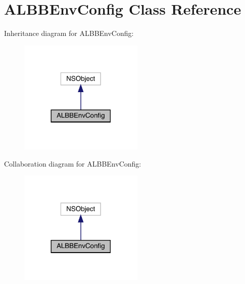 \hypertarget{interface_a_l_b_b_env_config}{}\section{A\+L\+B\+B\+Env\+Config Class Reference}
\label{interface_a_l_b_b_env_config}


Inheritance diagram for A\+L\+B\+B\+Env\+Config\+:\nopagebreak
\begin{figure}[H]
\begin{center}
\leavevmode
\includegraphics[width=168pt]{interface_a_l_b_b_env_config__inherit__graph}
\end{center}
\end{figure}


Collaboration diagram for A\+L\+B\+B\+Env\+Config\+:\nopagebreak
\begin{figure}[H]
\begin{center}
\leavevmode
\includegraphics[width=168pt]{interface_a_l_b_b_env_config__coll__graph}
\end{center}
\end{figure}

